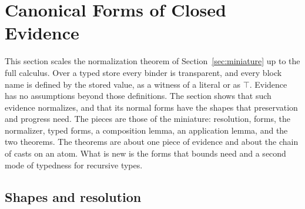 \mathtgt
\section{Canonical Forms of Closed Evidence}\label{sec:canonical}

This section scales the normalization theorem of Section~\ref{sec:miniature} up to the full calculus. Over a typed store every binder is transparent, and every block name is defined by the stored value, as a witness of a literal or as $\top$. Evidence has no assumptions beyond those definitions. The section shows that such evidence normalizes, and that its normal forms have the shapes that preservation and progress need. The pieces are those of the miniature: resolution, forms, the normalizer, typed forms, a composition lemma, an application lemma, and the two theorems. The theorems are about one piece of evidence and about the chain of casts on an atom. What is new is the forms that bounds need and a second mode of typedness for recursive types.

\subsection{Shapes and resolution}\label{sec:resolution}

